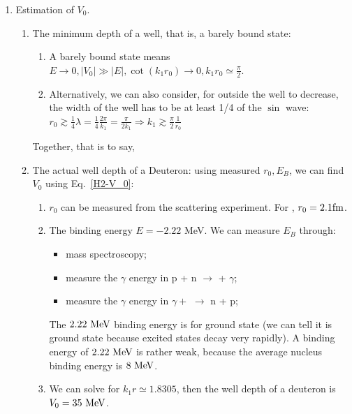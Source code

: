 \documentclass{school-22.101-notes}
\begin{document}
\begin{enumerate}
\item Estimation of $V_0$. 
  \begin{enumerate}
  \item The minimum depth of a well, that is, a barely bound state:
    \begin{enumerate}
    \item A barely bound state means $\displaystyle E \to 0, |V_0| \gg |E|, \cot (k_1 r_0) \to 0, k_1 r_0 \simeq \frac{\pi}{2}$. 
    \item Alternatively, we can also consider, for outside the well to decrease, the width of the well has to be at least 1/4 of the $\sin$ wave: $\displaystyle r_0 \gtrsim \frac{1}{4}\lambda = \frac{1}{4}\frac{2 \pi}{k_1}  = \frac{\pi}{2k_1}  \Rightarrow k_1 \gtrsim \frac{\pi}{2} \frac{1}{r_0} $
    \end{enumerate}
    Together, that is to say,

  \item The actual well depth of a Deuteron: using measured $r_0, E_B$, we can find $V_0$ using Eq.~\ref{H2-V_0}:
    \begin{enumerate}
    \item $r_0$ can be measured from the scattering experiment. For , $r_0 = 2.1 \mathrm{fm}$. 
    \item The binding energy $E = -2.22$ MeV. We can measure $E_B$ through: 
      \begin{itemize}
      \item mass spectroscopy;
      \item measure the $\gamma$ energy in p + n $\to$  + $\gamma$;
      \item measure the $\gamma$ energy in $\gamma +$  $\to$ n + p;
      \end{itemize}
      The $2.22 \mbox{ } \mathrm{MeV}$ binding energy is for ground state  (we can tell it is ground state because excited states decay very rapidly). A binding energy of $2.22 \mbox{ } \mathrm{MeV}$ is rather weak, because the average nucleus binding energy is $8 \mbox{ } \mathrm{MeV}$. 

    \item We can solve for $k_1 r \simeq 1.8305$, then the well depth of a deuteron is $V_0 = 35 \mbox{ } \mathrm{MeV}$.
    \end{enumerate}
  \end{enumerate}



\end{enumerate}
\end{document}
